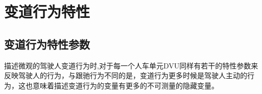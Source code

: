 


\section{变道行为特性}

\subsection{变道行为特性参数}
描述微观的驾驶人变道行为时,对于每一个人车单元DVU同样有若干的特性参数来反映驾驶人的行为，与跟驰行为不同的是，变道行为更多时候是驾驶人主动的行为，这也意味着描述变道行为的变量有更多的不可测量的隐藏变量。

